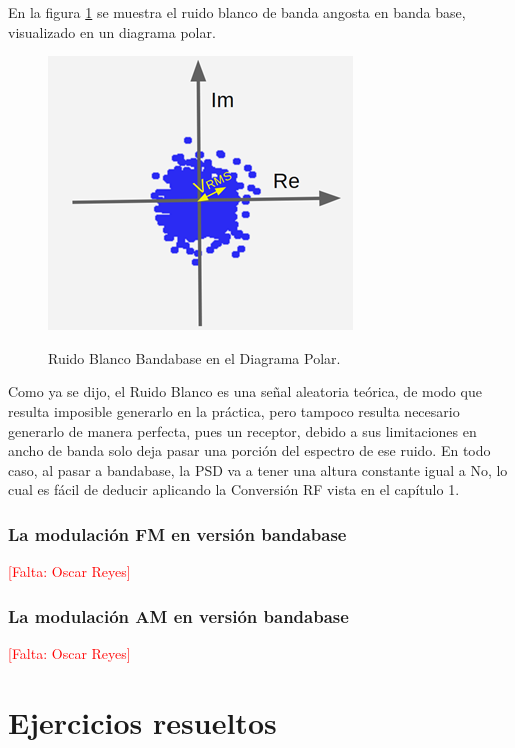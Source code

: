 En la figura \ref{fig:Diagrama-Polar} se muestra el ruido blanco de banda angosta en banda base, visualizado en un diagrama polar.

\begin{figure}[h!]
	\captionsetup{justification = raggedright, singlelinecheck = false}
	\caption{Ruido Blanco Bandabase en el Diagrama Polar.} 
	\centering
	\includegraphics[scale=1]{Imagenes/Diagrama-Polar.png}
	\label{fig:Diagrama-Polar}
\end{figure}

Como ya se dijo, el Ruido Blanco es una señal aleatoria teórica, de modo que resulta imposible generarlo en la práctica, pero tampoco resulta necesario generarlo de manera perfecta, pues un receptor, debido a sus limitaciones en ancho de banda solo deja pasar una porción del espectro de ese ruido. En todo caso, al pasar a bandabase, la PSD va a tener una altura constante igual a No, lo cual es fácil de deducir aplicando la Conversión RF vista en el capítulo 1.

\subsubsection{La modulación FM en versión bandabase}
\textcolor{red}{[Falta: Oscar Reyes]} %
\subsubsection{La modulación AM en versión bandabase}
\textcolor{red}{[Falta: Oscar Reyes]}
\section{Ejercicios resueltos}
